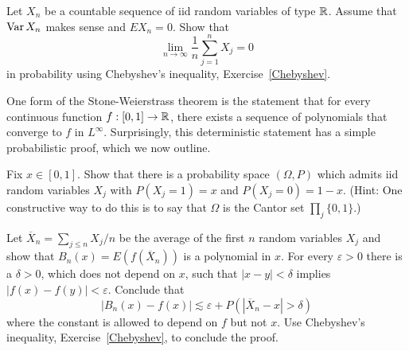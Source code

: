 \begin{exercise}
Let $X_{n}$ be a countable sequence of iid random variables of type $\mathbb{R}$.
Assume that $\operatorname{Var} X_{n}$ makes sense and $EX_{n} = 0$. Show that
\[\lim_{n \to \infty} \frac{1}{n} \sum_{j=1}^{n} X_{j} = 0\]
in probability using Chebyshev's inequality, Exercise~\ref{Chebyshev}.
\end{exercise}

\begin{exercise}
One form of the Stone-Weierstrass theorem is the statement that for every continuous function $f: [0, 1] \to \mathbb{R}$, there exists a sequence of polynomials that converge to $f$ in $L^{\infty}$.
Surprisingly, this deterministic statement has a simple probabilistic proof, which we now outline.

Fix $x \in [0, 1]$.
Show that there is a probability space $(\Omega, P)$ which admits iid random variables $X_{j}$ with $P(X_{j} = 1) = x$ and $P(X_{j} = 0) = 1 - x$.
(Hint: One constructive way to do this is to say that $\Omega$ is the Cantor set $\prod_{j} \{0, 1\}$.)

Let $\overline X_{n} = \sum_{j \leq n} X_{j}/n$ be the average of the first $n$ random variables $X_{j}$ and show that $B_{n}(x) = E(f(\overline X_{n}))$ is a polynomial in $x$.
For every $\varepsilon > 0$ there is a $\delta > 0$, which does not depend on $x$, such that $|x - y| < \delta$ implies $|f(x) - f(y)| < \varepsilon$.
Conclude that
\[|B_{n}(x) - f(x)| \lesssim \varepsilon + P(|\overline X_{n} - x| > \delta)\]
where the constant is allowed to depend on $f$ but not $x$.
Use Chebyshev's inequality, Exercise~\ref{Chebyshev}, to conclude the proof.
\end{exercise}
